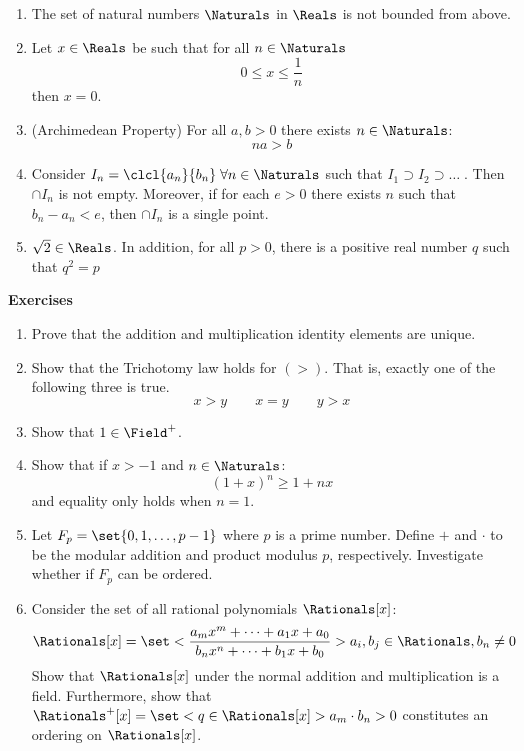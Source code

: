 \begin{results}
    \leavevmode
    \begin{enumerate}
        \item The set of natural numbers \(\Naturals\) in \(\Reals\) is not bounded from above.
        \item Let \(x \in \Reals\) be such that for all \(n \in \Naturals\)
              \[ 0\leq x \leq \dfrac{1}{n}\]
              then \(x = 0\).
        \item (Archimedean Property) For all \(a,b > 0\) there exists \(n \in \Naturals\):
              \[ na > b\]
        \item Consider \(I_n = \clcl{a_n}{b_n} \;\forall n \in \Naturals \) such that \(I_1 \supset I_2 \supset \dots\;\). Then \(\cap{I_n}\) is not empty. Moreover, if for each \(e > 0\) there exists \( n\) such that \(b_n - a_n < e\), then \(\cap{I_n}\) is a single point.
        \item \(\sqrt{2} \in \Reals\). In addition, for all \(p > 0\), there is a positive real number \(q \) such that \(q^2 = p\)
    \end{enumerate}
\end{results}
\newpage
{\Large\textbf{Exercises}}
\begin{enumerate}
    \item Prove that the addition and multiplication identity elements are unique.
    \item Show that the Trichotomy law holds for \( (>) \). That is, exactly one of the following three is true.
          \[ x > y \qquad x = y \qquad y > x\]
    \item Show that \(1 \in \Field^+\).
    \item Show that if \(x > -1\) and \(n \in \Naturals\):
          \[(1 + x)^n \geq 1 + nx\]
          and equality only holds when \(n = 1\).
    \item Let \(F_p = \set{ 0, 1, \dots, p -1 }\) where \(p\) is a prime number. Define \(+\) and \(\cdot\) to be the modular addition and product modulus \(p\), respectively. Investigate whether if \(F_p\) can be ordered.
    \item Consider the set of all rational polynomials \(\Rationals[x]\):
          \[\Rationals[x] = \set< \frac{a_m x^m + \dots + a_1 x + a_0}{b_n x^n + \dots + b_1 x + b_0}>{ a_i, b_j \in \Rationals, b_n \neq 0}\]
          Show that \(\Rationals[x]\) under the normal addition and multiplication is a field. Furthermore, show that \(\Rationals^+[x] = \set< q \in \Rationals[x] >{ a_m \cdot b_n > 0 }\) constitutes an ordering on \(\Rationals[x]\).
\end{enumerate}

